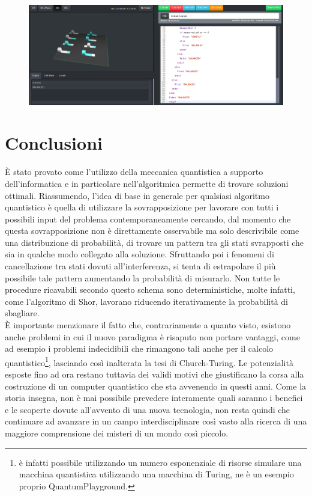 \documentclass[12pt,a4paper,openright]{report}
\begin{document}
\begin{figure}[h]
    
            \includegraphics[width=.92\textwidth,height=\textheight,keepaspectratio]{nonLinearBalancedFunction}
        
\end{figure}

\chapter{Conclusioni}
È stato provato come l'utilizzo della meccanica quantistica a supporto dell'informatica e in particolare nell'algoritmica permette di trovare soluzioni ottimali.
Riassumendo, l'idea di base in generale per qualsiasi algoritmo quantistico è quella di utilizzare la sovrapposizione per lavorare con tutti i possibili input
del problema contemporaneamente cercando, dal momento che questa sovrapposizione non è direttamente osservabile ma solo descrivibile come una distribuzione di 
probabilità, di trovare un pattern tra gli stati svrapposti che sia in qualche modo collegato alla soluzione. Sfruttando poi i fenomeni di cancellazione tra stati
dovuti all'interferenza, si tenta di estrapolare il più possibile tale pattern aumentando la probabilità di misurarlo. Non tutte le procedure ricavabili secondo
questo schema sono deterministiche, molte infatti, come l'algoritmo di Shor, lavorano riducendo iterativamente la probabilità di sbagliare.\\
È importante menzionare il fatto che, contrariamente a quanto visto, esistono anche problemi in cui il nuovo paradigma è risaputo non portare vantaggi, 
come ad esempio i problemi indecidibili che rimangono tali anche per il calcolo quantistico\footnote{è infatti possibile
utilizzando un numero esponenziale di risorse simulare una macchina quantistica utilizzando una macchina di Turing, ne è un esempio proprio QuantumPlayground.}, lasciando così inalterata la tesi di Church-Turing.
Le potenzialità esposte fino ad ora restano tuttavia dei validi motivi che giustificano la corsa alla costruzione di un computer quantistico
che sta avvenendo in questi anni. Come la storia insegna, non è mai possibile prevedere interamente quali saranno i benefici e le scoperte dovute all'avvento di una nuova tecnologia,
non resta quindi che continuare ad avanzare in un campo interdisciplinare così vasto alla ricerca di una maggiore comprensione dei misteri di un mondo così piccolo.
\end{document}
